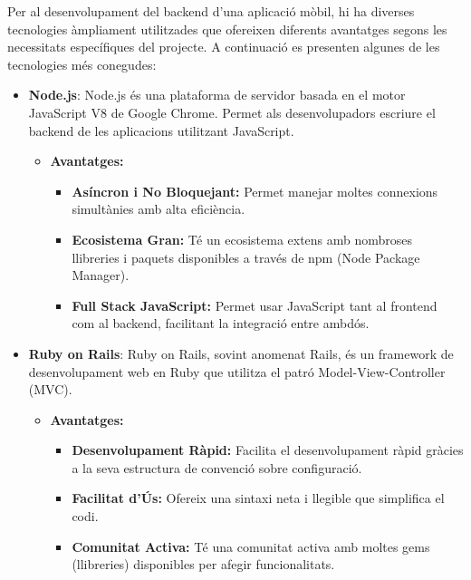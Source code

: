 \documentclass[a4paper,12pt,twoside]{ThesisStyle}
\begin{document}
Per al desenvolupament del backend d'una aplicació mòbil, hi ha diverses tecnologies àmpliament utilitzades que ofereixen diferents avantatges segons les necessitats específiques del projecte. A continuació es presenten algunes de les tecnologies més conegudes:

\begin{itemize}
    \item \textbf{Node.js}: Node.js és una plataforma de servidor basada en el motor JavaScript V8 de Google Chrome. Permet als desenvolupadors escriure el backend de les aplicacions utilitzant JavaScript. 
    \begin{itemize}
        \item \textbf{Avantatges:}
        \begin{itemize}
            \item \textbf{Asíncron i No Bloquejant:} Permet manejar moltes connexions simultànies amb alta eficiència.
            \item \textbf{Ecosistema Gran:} Té un ecosistema extens amb nombroses llibreries i paquets disponibles a través de npm (Node Package Manager).
            \item \textbf{Full Stack JavaScript:} Permet usar JavaScript tant al frontend com al backend, facilitant la integració entre ambdós.
        \end{itemize}
    \end{itemize}
    
    \item \textbf{Ruby on Rails}: Ruby on Rails, sovint anomenat Rails, és un framework de desenvolupament web en Ruby que utilitza el patró Model-View-Controller (MVC).
    \begin{itemize}
        \item \textbf{Avantatges:}
        \begin{itemize}
            \item \textbf{Desenvolupament Ràpid:} Facilita el desenvolupament ràpid gràcies a la seva estructura de convenció sobre configuració.
            \item \textbf{Facilitat d'Ús:} Ofereix una sintaxi neta i llegible que simplifica el codi.
            \item \textbf{Comunitat Activa:} Té una comunitat activa amb moltes gems (llibreries) disponibles per afegir funcionalitats.
        \end{itemize}
    \end{itemize}


\end{itemize}
\end{document}
